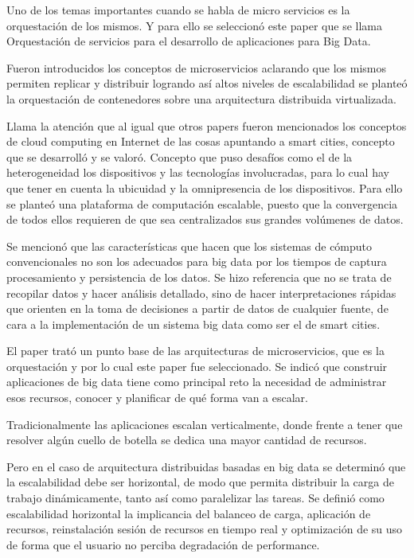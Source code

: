 
Uno de los temas importantes cuando se habla de micro servicios es la orquestación de los mismos. Y para ello se seleccionó este paper  que se llama Orquestación de servicios para el desarrollo de aplicaciones para Big Data. 


Fueron introducidos los conceptos de microservicios aclarando que los mismos permiten replicar y distribuir logrando así altos niveles de escalabilidad se planteó la orquestación de contenedores sobre una arquitectura distribuida virtualizada. 

Llama la atención que al igual que otros papers fueron mencionados los conceptos de cloud computing en Internet de las cosas apuntando a smart cities, concepto que se desarrolló y se valoró. Concepto que puso desafíos como el de la heterogeneidad los dispositivos y las tecnologías involucradas, para lo cual hay que tener en cuenta la ubicuidad y la omnipresencia de los dispositivos. 
Para ello se planteó una plataforma de computación escalable, puesto que la convergencia de todos ellos requieren de que sea centralizados sus grandes  volúmenes de datos. 

Se mencionó que las características que hacen que los sistemas de cómputo convencionales no son los adecuados para big data por los tiempos de captura procesamiento y persistencia de los datos. Se hizo referencia que no se trata de recopilar datos y hacer análisis detallado, sino de hacer interpretaciones rápidas que orienten en la toma de decisiones a partir de datos de cualquier fuente, de cara a la implementación de un sistema big data como ser el de smart cities.


El paper trató un punto base de las arquitecturas de microservicios, que es la orquestación y por lo cual este paper fue seleccionado. Se indicó que construir aplicaciones de big data tiene como principal reto la necesidad de administrar esos recursos, conocer y planificar de qué forma van a escalar. 

Tradicionalmente las aplicaciones escalan verticalmente, donde frente a tener que resolver algún cuello de botella se dedica una mayor cantidad de recursos. 

Pero en el caso de arquitectura distribuidas basadas en big data se determinó que la escalabilidad debe ser horizontal, de modo que permita distribuir la carga de trabajo dinámicamente, tanto así como paralelizar las tareas. 
Se definió como escalabilidad horizontal la implicancia del balanceo de carga, aplicación de recursos, reinstalación sesión de recursos en tiempo real y optimización de su uso de forma que el usuario no perciba degradación de performance. 


